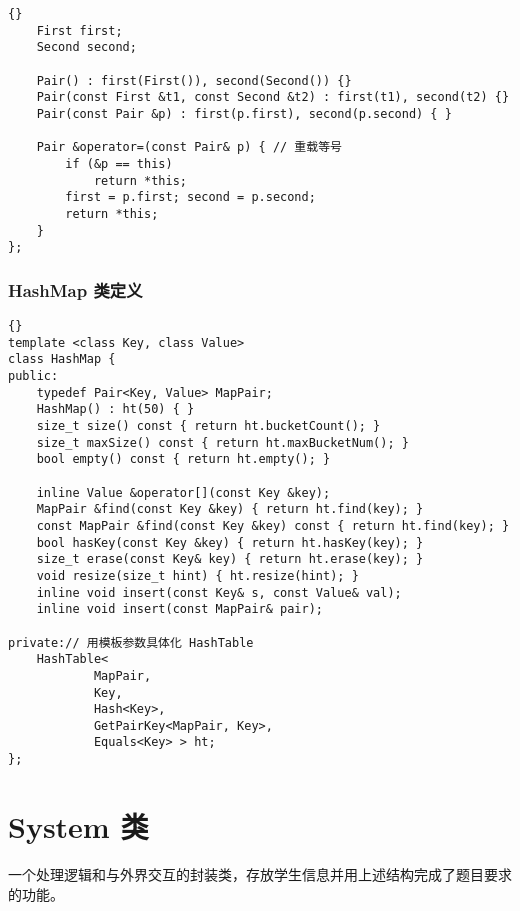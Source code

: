 {\begin{lstlisting}[firstnumber=699, caption=Pair 类定义]{}
    First first;
    Second second;

    Pair() : first(First()), second(Second()) {}
    Pair(const First &t1, const Second &t2) : first(t1), second(t2) {}
    Pair(const Pair &p) : first(p.first), second(p.second) { }

    Pair &operator=(const Pair& p) { // 重载等号
        if (&p == this)
            return *this;
        first = p.first; second = p.second;
        return *this;
    }
};
\end{lstlisting}

\subsection{HashMap 类定义}
\begin{lstlisting}[firstnumber=734, caption=HashMap 类定义]{}
template <class Key, class Value>
class HashMap {
public:
    typedef Pair<Key, Value> MapPair;
    HashMap() : ht(50) { }
    size_t size() const { return ht.bucketCount(); }
    size_t maxSize() const { return ht.maxBucketNum(); }
    bool empty() const { return ht.empty(); }

    inline Value &operator[](const Key &key);
    MapPair &find(const Key &key) { return ht.find(key); }
    const MapPair &find(const Key &key) const { return ht.find(key); }
    bool hasKey(const Key &key) { return ht.hasKey(key); }
    size_t erase(const Key& key) { return ht.erase(key); }
    void resize(size_t hint) { ht.resize(hint); }
    inline void insert(const Key& s, const Value& val);
    inline void insert(const MapPair& pair);

private:// 用模板参数具体化 HashTable
    HashTable<
            MapPair,
            Key,
            Hash<Key>,
            GetPairKey<MapPair, Key>,
            Equals<Key> > ht;
};
\end{lstlisting}

}


\chapter{System 类}

一个处理逻辑和与外界交互的封装类，存放学生信息并用上述结构完成了题目要求的功能。

